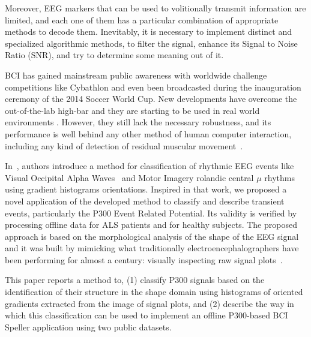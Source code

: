\documentclass[entropy,article,submit,moreauthors,pdftex,10pt,a4paper]{mdpi}
\begin{document}
Moreover, EEG markers \citep{Clerc} that can be used to volitionally transmit information are limited, and each one of them has a particular combination of appropriate methods to decode them. Inevitably, it is necessary to implement  distinct and specialized algorithmic methods, to filter the signal, enhance its Signal to Noise Ratio (SNR), and try to determine some meaning out of it.  



BCI has gained mainstream public awareness with worldwide challenge competitions like Cybathlon  \citep{Riener2014} and even been broadcasted during the inauguration ceremony of the 2014 Soccer World Cup.  New developments have overcome the out-of-the-lab high-bar and they are starting to be used in real world environments \citep{Huggins2016}.  However, they still lack the necessary robustness, and its performance is well behind any other method of human computer interaction, including any kind of detection of residual muscular movement~\citep{Clerc}.

In~\citep{Ramele2016},  authors introduce a method for classification of rhythmic EEG events like Visual Occipital Alpha Waves~\citep{Ben-Simon2013}  and Motor Imagery rolandic central $\mu$ rhythms~\citep{Hartman2005} using gradient histograms orientations. Inspired in that work, we proposed a novel application of the developed method to classify and describe transient events, particularly the P300 Event Related Potential.  Its validity is verified by processing offline data for ALS patients and for healthy subjects. 
The proposed approach is based on the morphological analysis of the shape of the EEG signal~\citep{Alvarado-Gonzalez2016,Yamaguchi2009} and it was built by mimicking what traditionally electroencephalographers have been performing for almost a century: visually inspecting raw signal plots~\citep{Hartman2005}.

This paper reports a method to, (1) classify P300 signals based on the identification of their structure in the shape domain using histograms of oriented gradients extracted from the image of signal plots, and (2) describe the way in which this classification can be used to implement an offline P300-based BCI Speller application using two public datasets.
\end{document}

